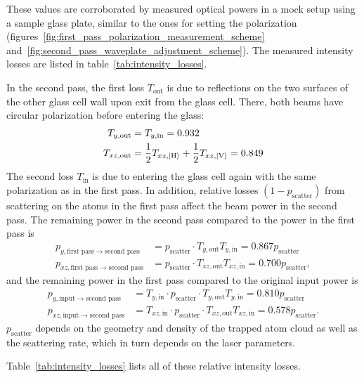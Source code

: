 These values are corroborated by measured optical powers in a mock setup using a sample glass plate, similar to the ones for setting the polarization (figures~\ref{fig:first_pass_polarization_measurement_scheme} and~\ref{fig:second_pass_waveplate_adjustment_scheme}). The measured intensity losses are listed in table~\ref{tab:intensity_losses}.

In the second pass, the first loss $T_{\text{out}}$ is due to reflections on the two surfaces of the other glass cell wall upon exit from the glass cell. There, both beams have circular polarization before entering the glass:
\begin{align}
    T_{y, \text{out}} &= T_{y, \text{in}} = 0.932 \\
    T_{xz, \text{out}} &= \frac{1}{2} T_{xz, \Ket{\text{H}}} + \frac{1}{2} T_{xz, \Ket{\text{V}}} = 0.849
\end{align}
The second loss $T_{\text{in}}$ is due to entering the glass cell again with the same polarization as in the first pass. In addition, relative losses ${(1 - p_\text{scatter})}$ from scattering on the atoms in the first pass affect the beam power in the second pass. The remaining power in the second pass compared to the power in the first pass is
\begin{align}
    p_{y, \text{first pass} \rightarrow \text{second pass}} &= p_\text{scatter} \cdot T_{y, \text{out}} T_{y, \text{in}}   =  0.867 p_\text{scatter}\\
    p_{xz, \text{first pass} \rightarrow \text{second pass}} &= p_\text{scatter} \cdot T_{xz, \text{out}} T_{xz, \text{in}}   = 0.700 p_\text{scatter},
\end{align}
and the remaining power in the first pass compared to the original input power is
\begin{align}
    p_{y, \text{input} \rightarrow \text{second pass}} &= T_{y, \text{in}} \cdot p_\text{scatter} \cdot T_{y, \text{out}} T_{y, \text{in}} =  0.810 p_\text{scatter} \\
    p_{xz, \text{input} \rightarrow \text{second pass}} &= T_{xz, \text{in}} \cdot p_\text{scatter} \cdot T_{xz, \text{out}} T_{xz, \text{in}} = 0.578 p_\text{scatter}.
\end{align}
$p_\text{scatter}$ depends on the geometry and density of the trapped atom cloud as well as the scattering rate, which in turn depends on the laser parameters.

Table~\ref{tab:intensity_losses} lists all of these relative intensity losses.

